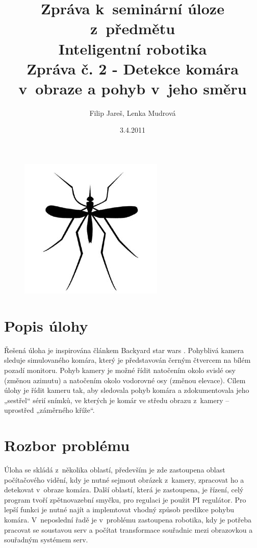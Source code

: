 \documentclass[a4paper,10pt]{article}
\title{Zpráva k~seminární úloze z~předmětu\\ Inteligentní robotika \\ {\small Zpráva č. 2 - Detekce komára v~obraze a pohyb v~jeho směru}}
\author{Filip Jareš, Lenka Mudrová}
\date{3.4.2011}
\begin{document}
\maketitle
\begin{figure}[!h]
	\centering
	\includegraphics[width=0.4\columnwidth]{pics/mosquito}
\end{figure}
\newpage


\section{Popis úlohy}

		Řešená úloha je inspirována článkem Backyard star wars \cite{zadani}. Pohyblivá
		kamera sleduje simulovaného komára, který je představován černým čtvercem na
		bílém pozadí monitoru. Pohyb kamery je možné řídit natočením okolo svislé osy
		(změnou azimutu) a natočením okolo vodorovné osy (změnou elevace). Cílem úlohy
		je řídit kameru tak, aby sledovala pohyb komára a zdokumentovala jeho „sestřel“
		sérií snímků, ve kterých je komár ve středu obrazu z~kamery – uprostřed
		„záměrného kříže“.

\section{Rozbor problému}

		Úloha se skládá z~několika oblastí, především je zde zastoupena oblast
		po\-čí\-ta\-čo\-vé\-ho vidění, kdy je nutné sejmout obrázek z~kamery, zpracovat ho a
		detekovat v~obraze komára. Další oblastí, která je zastoupena, je řízení, celý
		program tvoří zpětnovazební smyčku, pro regulaci je použit PI regulátor. Pro
		lepší funkci je nutné najít a implemtovat vhodný způsob predikce pohybu komára.
		V~neposlední řadě je v~problému zastoupena robotika, kdy je potřeba pracovat se
		soustavou serv a počítat transformace souřadnic mezi obrazovkou a souřadným
		systémem serv.
\end{document}
